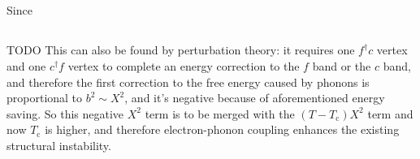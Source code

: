 \documentclass[hyperref, a4paper]{article}
\begin{document}
\subsection{}

Since 

\subsection{}

TODO 
This can also be found by perturbation theory:
it requires one $f^\dagger c$ vertex and one $c^\dagger f$ vertex 
to complete an energy correction to the $f$ band or the $c$ band,
and therefore the first correction to the free energy 
caused by phonons 
is proportional to $b^2 \sim X^2$,
and it's negative because of aforementioned energy saving.
So this negative $X^2$ term is to be merged with the $(T - T_{\text{c}}) X^2$ term  
and now $T_{\text{c}}$ is higher, 
and therefore electron-phonon coupling enhances the existing structural instability.

\printbibliography
\end{document}
